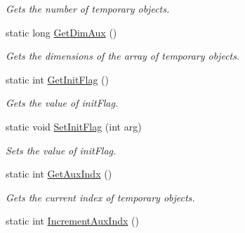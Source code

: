 \begin{DoxyCompactItemize}
\begin{DoxyCompactList}\small\item\em Gets the number of temporary objects. \item\end{DoxyCompactList}\item 
\hypertarget{classDMatrix_a591f532e37974cc25ebc194e9fc7d7e3}{
static long \hyperlink{classDMatrix_a591f532e37974cc25ebc194e9fc7d7e3}{GetDimAux} ()}
\label{classDMatrix_a591f532e37974cc25ebc194e9fc7d7e3}

\begin{DoxyCompactList}\small\item\em Gets the dimensions of the array of temporary objects. \item\end{DoxyCompactList}\item 
\hypertarget{classDMatrix_a14abde5d3504796b201a0202a8970f51}{
static int \hyperlink{classDMatrix_a14abde5d3504796b201a0202a8970f51}{GetInitFlag} ()}
\label{classDMatrix_a14abde5d3504796b201a0202a8970f51}

\begin{DoxyCompactList}\small\item\em Gets the value of initFlag. \item\end{DoxyCompactList}\item 
\hypertarget{classDMatrix_a8cef5f97f92074b16625846b8f550df1}{
static void \hyperlink{classDMatrix_a8cef5f97f92074b16625846b8f550df1}{SetInitFlag} (int arg)}
\label{classDMatrix_a8cef5f97f92074b16625846b8f550df1}

\begin{DoxyCompactList}\small\item\em Sets the value of initFlag. \item\end{DoxyCompactList}\item 
\hypertarget{classDMatrix_ace53a9ed8bb434bc0a67b1f069316f9f}{
static int \hyperlink{classDMatrix_ace53a9ed8bb434bc0a67b1f069316f9f}{GetAuxIndx} ()}
\label{classDMatrix_ace53a9ed8bb434bc0a67b1f069316f9f}

\begin{DoxyCompactList}\small\item\em Gets the current index of temporary objects. \item\end{DoxyCompactList}\item 
\hypertarget{classDMatrix_ab4a11314f2975a137017e2d57cd3e5d5}{
static int \hyperlink{classDMatrix_ab4a11314f2975a137017e2d57cd3e5d5}{IncrementAuxIndx} ()}
\label{classDMatrix_ab4a11314f2975a137017e2d57cd3e5d5}


\end{DoxyCompactItemize}
